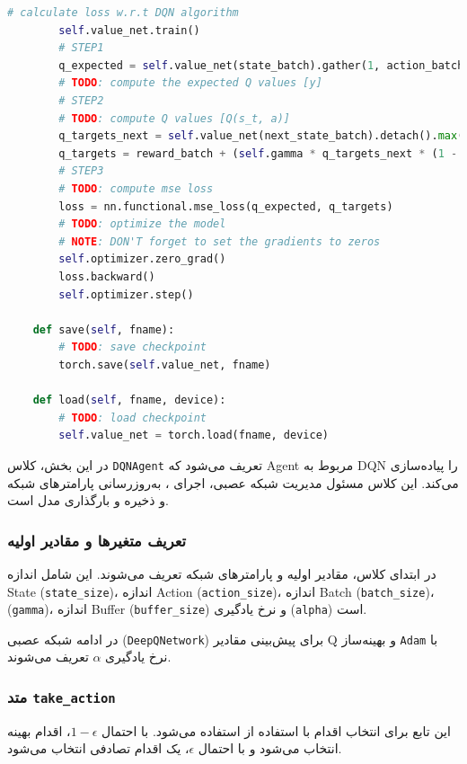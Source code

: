 \documentclass{article}
\begin{document}
\begin{LTR}
\begin{lstlisting}[language=Python, caption=Agent Class]
        # calculate loss w.r.t DQN algorithm
        self.value_net.train()
        # STEP1
        q_expected = self.value_net(state_batch).gather(1, action_batch)
        # TODO: compute the expected Q values [y]
        # STEP2
        # TODO: compute Q values [Q(s_t, a)]
        q_targets_next = self.value_net(next_state_batch).detach().max(1)[0].unsqueeze(1)
        q_targets = reward_batch + (self.gamma * q_targets_next * (1 - done_batch*1))
        # STEP3
        # TODO: compute mse loss
        loss = nn.functional.mse_loss(q_expected, q_targets)
        # TODO: optimize the model
        # NOTE: DON'T forget to set the gradients to zeros
        self.optimizer.zero_grad()
        loss.backward()
        self.optimizer.step()

    def save(self, fname):
        # TODO: save checkpoint
        torch.save(self.value_net, fname)

    def load(self, fname, device):
        # TODO: load checkpoint
        self.value_net = torch.load(fname, device)
	\end{lstlisting}
\end{LTR}

در این بخش، کلاس \texttt{DQNAgent} تعریف می‌شود که Agent مربوط به DQN را پیاده‌سازی می‌کند. این کلاس مسئول مدیریت شبکه عصبی، اجرای  
، به‌روزرسانی پارامترهای شبکه و ذخیره و بارگذاری مدل است.

\subsubsection{تعریف متغیرها و مقادیر اولیه}

در ابتدای کلاس، مقادیر اولیه و پارامترهای شبکه تعریف می‌شوند. این شامل اندازه State
 (\texttt{state\_size})، اندازه Action
 (\texttt{action\_size})، اندازه 
 Batch
  (\texttt{batch\_size})، (\texttt{gamma})، اندازه Buffer  (\texttt{buffer\_size}) و نرخ یادگیری (\texttt{alpha}) است.



در ادامه
شبکه عصبی (\texttt{DeepQNetwork}) برای پیش‌بینی مقادیر Q و بهینه‌ساز \texttt{Adam} با نرخ یادگیری $\alpha$ تعریف می‌شوند.



\subsubsection{متد \texttt{take\_action}}

این تابع برای انتخاب اقدام با استفاده از
 استفاده می‌شود. با احتمال $1 - \epsilon$، اقدام بهینه انتخاب می‌شود و با احتمال $\epsilon$، یک اقدام تصادفی انتخاب می‌شود.
\end{document}
